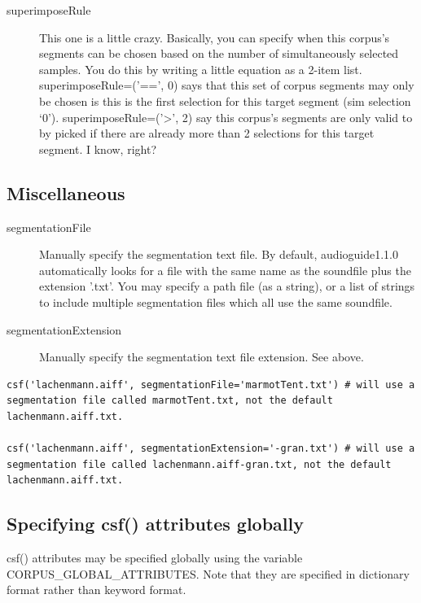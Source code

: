 \documentclass{article}
\newcommand{\ag}{audioguide1.1.0\xspace}
\begin{document}
\begin{spacing}{1.2}
\begin{description}

\item[superimposeRule]  This one is a little crazy.  Basically, you can specify when this corpus's segments can be chosen based on the number of simultaneously selected samples.  You do this by writing a little equation as a 2-item list.  superimposeRule=('==', 0) says that this set of corpus segments may only be chosen is this is the first selection for this target segment (sim selection `0').  superimposeRule=('>', 2) say this corpus's segments are only valid to by picked if there are already more than 2 selections for this target segment.  I know, right?
\end{description}


\subsection{Miscellaneous}
\begin{description}
\item[segmentationFile] Manually specify the segmentation text file. By default, \ag automatically looks for a file with the same name as the soundfile plus the extension '.txt'. You may specify a path file (as a string), or a list of strings to include multiple segmentation files which all use the same soundfile.

\item[segmentationExtension] Manually specify the segmentation text file extension.  See above.
\end{description}

\begin{lstlisting}
csf('lachenmann.aiff', segmentationFile='marmotTent.txt') # will use a segmentation file called marmotTent.txt, not the default lachenmann.aiff.txt.

csf('lachenmann.aiff', segmentationExtension='-gran.txt') # will use a segmentation file called lachenmann.aiff-gran.txt, not the default lachenmann.aiff.txt.
\end{lstlisting}


\subsection{Specifying csf() attributes globally}
csf() attributes may be specified globally using the variable CORPUS\_GLOBAL\_ATTRIBUTES.  Note that they are specified in dictionary format rather than keyword format.


\end{spacing}
\end{document}

